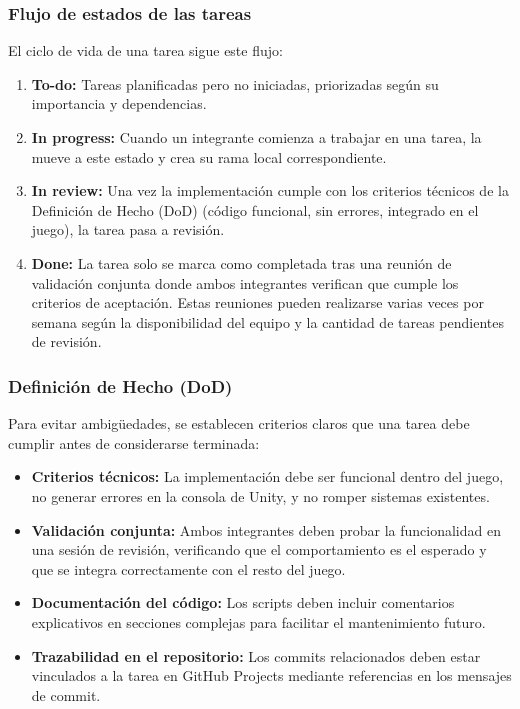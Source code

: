 \subsubsection{Flujo de estados de las tareas}

El ciclo de vida de una tarea sigue este flujo:

\begin{enumerate}
    \item \textbf{To-do:} Tareas planificadas pero no iniciadas, priorizadas según 
    su importancia y dependencias.
    \item \textbf{In progress:} Cuando un integrante comienza a trabajar en una tarea, 
    la mueve a este estado y crea su rama local correspondiente.
    \item \textbf{In review:} Una vez la implementación cumple con los criterios técnicos 
    de la Definición de Hecho (DoD) (código funcional, sin errores, integrado en el juego), 
    la tarea pasa a revisión.
    \item \textbf{Done:} La tarea solo se marca como completada tras una reunión de 
    validación conjunta donde ambos integrantes verifican que cumple los criterios de 
    aceptación. Estas reuniones pueden realizarse varias veces por semana según la 
    disponibilidad del equipo y la cantidad de tareas pendientes de revisión.
\end{enumerate}

\subsubsection{Definición de Hecho (DoD)}

Para evitar ambigüedades, se establecen criterios claros que una tarea debe cumplir 
antes de considerarse terminada:

\begin{itemize}
    \item \textbf{Criterios técnicos:} La implementación debe ser funcional dentro 
    del juego, no generar errores en la consola de Unity, y no romper sistemas existentes.
    \item \textbf{Validación conjunta:} Ambos integrantes deben probar la funcionalidad 
    en una sesión de revisión, verificando que el comportamiento es el esperado y que 
    se integra correctamente con el resto del juego.
    \item \textbf{Documentación del código:} Los scripts deben incluir comentarios 
    explicativos en secciones complejas para facilitar el mantenimiento futuro.
    \item \textbf{Trazabilidad en el repositorio:} Los commits relacionados deben estar 
    vinculados a la tarea en GitHub Projects mediante referencias en los mensajes de commit.
\end{itemize}

